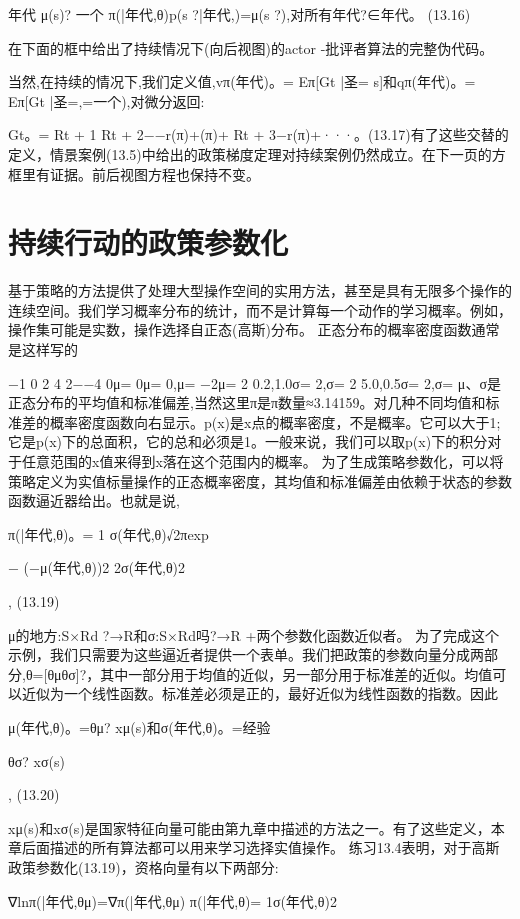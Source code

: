 年代
μ(s)?
一个
π(|年代,θ)p(s ?|年代,)=μ(s ?),对所有年代?∈年代。 					(13.16)


在下面的框中给出了持续情况下(向后视图)的actor -批评者算法的完整伪代码。
 
当然,在持续的情况下,我们定义值,vπ(年代)。= Eπ[Gt |圣= s]和qπ(年代)。= Eπ[Gt |圣=,=一个),对微分返回:

Gt。= Rt + 1 Rt + 2−−r(π)+(π)+ Rt + 3−r(π)+···。(13.17)有了这些交替的定义，情景案例(13.5)中给出的政策梯度定理对持续案例仍然成立。在下一页的方框里有证据。前后视图方程也保持不变。
 
\section{持续行动的政策参数化}

基于策略的方法提供了处理大型操作空间的实用方法，甚至是具有无限多个操作的连续空间。我们学习概率分布的统计，而不是计算每一个动作的学习概率。例如，操作集可能是实数，操作选择自正态(高斯)分布。
正态分布的概率密度函数通常是这样写的
 
−1 0 2 4 2−−4
0μ= 0μ= 0,μ=
−2μ=
2 0.2,1.0σ= 2,σ= 2 5.0,0.5σ= 2,σ=
μ、σ是正态分布的平均值和标准偏差,当然这里π是π数量≈3.14159。对几种不同均值和标准差的概率密度函数向右显示。p(x)是x点的概率密度，不是概率。它可以大于1;它是p(x)下的总面积，它的总和必须是1。一般来说，我们可以取p(x)下的积分对于任意范围的x值来得到x落在这个范围内的概率。
为了生成策略参数化，可以将策略定义为实值标量操作的正态概率密度，其均值和标准偏差由依赖于状态的参数函数逼近器给出。也就是说,

π(|年代,θ)。= 1
σ(年代,θ)√2πexp

−
(−μ(年代,θ))2 2σ(年代,θ)2

, 					(13.19)

μ的地方:S×Rd ?→R和σ:S×Rd吗?→R +两个参数化函数近似者。
为了完成这个示例，我们只需要为这些逼近者提供一个表单。我们把政策的参数向量分成两部分,θ=[θμθσ]?，其中一部分用于均值的近似，另一部分用于标准差的近似。均值可以近似为一个线性函数。标准差必须是正的，最好近似为线性函数的指数。因此

μ(年代,θ)。=θμ? xμ(s)和σ(年代,θ)。=经验

θσ? xσ(s)

, 					(13.20)

xμ(s)和xσ(s)是国家特征向量可能由第九章中描述的方法之一。有了这些定义，本章后面描述的所有算法都可以用来学习选择实值操作。
练习13.4表明，对于高斯政策参数化(13.19)，资格向量有以下两部分:

∇lnπ(|年代,θμ)=∇π(|年代,θμ)
π(|年代,θ)=
1σ(年代,θ)2

